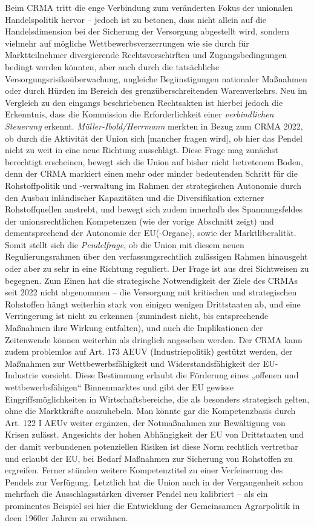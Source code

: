 \documentclass[12pt,a4paper,oneside]{book} %
\begin{document}
	Beim CRMA tritt die enge Verbindung zum veränderten Fokus der unionalen Handelspolitik hervor -- jedoch ist zu betonen, dass nicht allein auf die Handelsdimension bei der Sicherung der Versorgung abgestellt wird, sondern vielmehr auf mögliche Wettbewerbsverzerrungen wie sie durch für Marktteilnehmer divergierende Rechtsvorschirften und Zugangsbedingungen bedingt werden könnten, aber auch durch die tatsächliche Versorgungsrisikoüberwachung, ungleiche Begünstigungen nationaler Maßnahmen oder durch Hürden im Bereich des grenzüberschreitenden Warenverkehrs. Neu im Vergleich zu den eingangs beschriebenen Rechtsakten ist hierbei jedoch die Erkenntnis, dass die Kommission die Erforderlichkeit einer \textit{verbindlichen Steuerung} erkennt.\autocite{Schäffer/Hach, ZRP 2023, 207, 208} \textit{Müller-Ibold/Herrmann} merkten in Bezug zum CRMA 2022, ob durch die Aktivität der Union \glqq sich [mancher fragen wird], ob hier das Pendel nicht zu weit in eine neue Richtung ausschlägt\grqq.\autocite{Müller-Ibold/Herrmann, EuZW 2022, 1085, 1091} Diese Frage mag zunächst berechtigt erscheinen, bewegt sich die Union auf bisher nicht betretenem Boden, denn der CRMA markiert einen mehr oder minder bedeutenden Schritt für die Rohstoffpolitik und -verwaltung im Rahmen der strategischen Autonomie durch den Ausbau inländischer Kapazitäten und die Diversifikation externer Rohstoffquellen anstrebt, und bewegt sich zudem innerhalb des Spannungsfeldes der unionsrechtlichen Kompetenzen (wie der vorige Abschnitt zeigt) und dementsprechend der Autonomie der EU(-Organe), sowie der Marktliberalität. Somit stellt sich die \textit{Pendelfrage}, ob die Union mit diesem neuen Regulierungsrahmen über den verfassungsrechtlich zulässigen Rahmen hinausgeht oder aber zu sehr in eine Richtung reguliert. Der Frage ist aus drei Sichtweisen zu begegnen. Zum Einen hat die strategische Notwendigkeit der Ziele des CRMAs seit 2022 nicht abgenommen -- die Versorgung mit kritischen und strategischen Rohstoffen hängt weiterhin stark von einigen wenigen Drittstaaten ab, und eine Verringerung ist nicht zu erkennen (zumindest nicht, bis entsprechende Maßnahmen ihre Wirkung entfalten), und auch die Implikationen der Zeitenwende können weiterhin als dringlich angesehen werden. Der CRMA kann zudem problemlos auf Art. 173 AEUV (Industriepolitik) gestützt werden, der Maßnahmen zur Wettbewerbsfähigkeit und Widerstandsfähigkeit der EU-Industrie vorsieht. Diese Bestimmung erlaubt die Förderung eines „offenen und wettbewerbsfähigen“ Binnenmarktes und gibt der EU gewisse Eingriffsmöglichkeiten in Wirtschaftsbereiche, die als besonders strategisch gelten, ohne die Marktkräfte auszuhebeln. Man könnte gar die Kompetenzbasis durch Art. 122 I AEUv weiter ergänzen, der Notmaßnahmen zur Bewältigung von Krisen zulässt. Angesichts der hohen Abhängigkeit der EU von Drittstaaten und der damit verbundenen potenziellen Risiken ist diese Norm rechtlich vertretbar und erlaubt der EU, bei Bedarf Maßnahmen zur Sicherung von Rohstoffen zu ergreifen. Ferner stünden weitere Kompetenztitel zu einer Verfeinerung des Pendels zur Verfügung. Letztlich hat die Union auch in der Vergangenheit schon mehrfach die Ausschlagsstärken diverser Pendel neu kalibriert -- als ein prominentes Beispiel sei hier die Entwicklung der Gemeinsamen Agrarpolitik in deen 1960er Jahren zu erwähnen.
	
\end{document}
